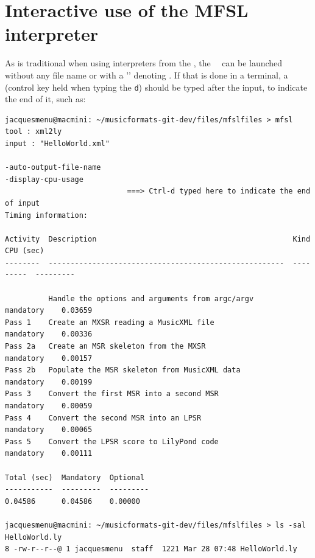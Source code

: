 \begin{figure}[p]
\begin{center}
\end{center}
\end{figure}


\section{Interactive use of the MFSL interpreter}

As is traditional when using interpreters from the \CLI, the \mfslLangInterp\ \mfslExec\ can be launched without any file name or with a '\code{-}' denoting \standardInput.
If that is done in a terminal, a  (control key held when typing the {\tt d}) should be typed after the input, to indicate the end of it, such as:
\begin{lstlisting}[language=Terminal]
jacquesmenu@macmini: ~/musicformats-git-dev/files/mfslfiles > mfsl
tool : xml2ly
input : "HelloWorld.xml"

-auto-output-file-name
-display-cpu-usage
							===> Ctrl-d typed here to indicate the end of input
Timing information:

Activity  Description                                             Kind       CPU (sec)
--------  ------------------------------------------------------  ---------  ---------

          Handle the options and arguments from argc/argv         mandatory    0.03659
Pass 1    Create an MXSR reading a MusicXML file                  mandatory    0.00336
Pass 2a   Create an MSR skeleton from the MXSR                    mandatory    0.00157
Pass 2b   Populate the MSR skeleton from MusicXML data            mandatory    0.00199
Pass 3    Convert the first MSR into a second MSR                 mandatory    0.00059
Pass 4    Convert the second MSR into an LPSR                     mandatory    0.00065
Pass 5    Convert the LPSR score to LilyPond code                 mandatory    0.00111

Total (sec)  Mandatory  Optional
-----------  ---------  ---------
0.04586      0.04586    0.00000

jacquesmenu@macmini: ~/musicformats-git-dev/files/mfslfiles > ls -sal HelloWorld.ly
8 -rw-r--r--@ 1 jacquesmenu  staff  1221 Mar 28 07:48 HelloWorld.ly
\end{lstlisting}


